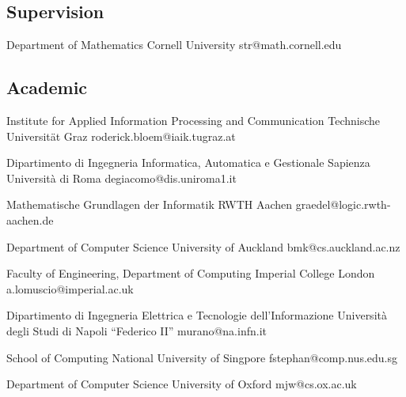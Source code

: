 \documentclass[10pt,a4paper,sans]{moderncv}
\begin{document}
\subsection{Supervision}

{Department of Mathematics}
{Cornell University}
{}
{str@math.cornell.edu}


\subsection{Academic}

{Institute for Applied Information Processing and Communication}
{Technische Universit\"at Graz}
{}
{roderick.bloem@iaik.tugraz.at}

{Dipartimento di Ingegneria Informatica, Automatica e Gestionale} 
{Sapienza Universit\`a di Roma}
{}
{degiacomo@dis.uniroma1.it}

{Mathematische Grundlagen der Informatik}
{RWTH Aachen}
{}
{graedel@logic.rwth-aachen.de}

{Department of Computer Science}
{University of Auckland}
{}
{bmk@cs.auckland.ac.nz}

{Faculty of Engineering, 
Department of Computing}
{Imperial College London}
{}
{a.lomuscio@imperial.ac.uk}

{Dipartimento di Ingegneria Elettrica e Tecnologie dell'Informazione} 
{Universit\`a degli Studi di Napoli ``Federico II''}
{}
{murano@na.infn.it}


{School of Computing}
{National University of Singpore}
{}
{fstephan@comp.nus.edu.sg}

{Department of Computer Science}
{University of Oxford}
{}
{mjw@cs.ox.ac.uk}
\fi
\end{document}
